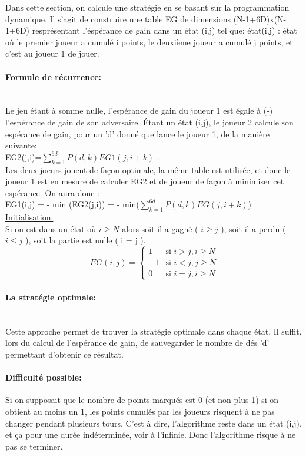 \documentclass{report}
\begin{document}
  \begin{large}
    Dans cette section, on calcule une stratégie en se basant sur la programmation dynamique. Il s'agit 
    de construire une table EG de dimensions (N-1+6D)x(N-1+6D) resprésentant l'éspérance de gain dans un état (i,j) tel que: 
    état(i,j) : état où le premier joueur a cumulé i points, le deuxième joueur a cumulé j
    points, et c'est au joueur 1 de jouer.
    \paragraph{\large{Formule de récurrence: }} \\
    Le jeu étant à somme nulle, l'espérance de gain du joueur 1 est égale à (-) l'espérance de gain de son adversaire. Étant un état (i,j),
    le joueur 2 calcule son espérance de gain, pour un 'd' donné que lance le joueur 1, de la manière suivante:\\
    EG2(j,i)=$\sum_{k=1}^{6d} {P(d,k)EG1(j,i+k)}$ .\\
    Les deux joeurs jouent de façon optimale, la même table est utilisée, et donc le joueur 1 
    est en mesure de calculer EG2 et de joueur de façon à minimiser cet espérance. On aura donc : \\
    EG1(i,j) = - min (EG2(j,i)) = - min($\sum_{k=1}^{6d} {P(d,k)EG(j,i+k)}$) \\
    \underline{Initialisation:}\\
    Si on est dans un état où $i \ge N$ alors soit il a gagné ( $i \ge j$ ), soit il a perdu ( $i \le j$ ), soit la partie est nulle ( i = j ). \\
    $$
\ EG(i,j) = \left\{
    \begin{array}{ll}
        1 & \mbox{si  } i>j, i\ge N \\
        -1 & \mbox{si } i<j, j\ge N  \\
        0 & \mbox{si  } i=j, i\ge N 
    \end{array}
\right.
$$
    \paragraph{\large{La stratégie optimale: }} \\
    Cette approche permet de trouver la stratégie optimale dans chaque état. Il suffit, lors du calcul 
    de l'espérance de gain, de sauvegarder le nombre de dés 'd' permettant d'obtenir ce résultat. 
    \paragraph{\large{Difficulté possible: }}
    Si on supposait que le nombre de points marqués est 0 (et non plus 1) si on obtient au moins un 1, 
    les points cumulés par les joueurs risquent à ne pas changer pendant plusieurs tours. C'est à dire,
    l'algorithme reste dans un état (i,j), et ça pour une durée indéterminée, voir à l'infinie. Donc l'algorithme risque à ne pas se terminer.
    

\end{large}
\end{document}
